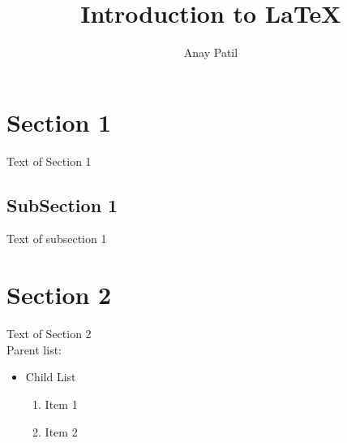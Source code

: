 \documentclass{article}
\begin{document}
	\title{Introduction to \LaTeX{}}
	\author{Anay Patil}

	\maketitle

	\tableofcontents

	\section{Section 1}
	{\selectfont \Large Text of Section 1}
	\subsection{SubSection 1}
	Text of subsection 1
	\section{Section 2}
	{\selectfont \Huge Text of Section 2}
	\\Parent list:
	\begin{itemize}
		\item Child List
		\begin{enumerate}
			\item Item 1
			\item Item 2
		\end{enumerate}
	\end{itemize}
\end{document}
